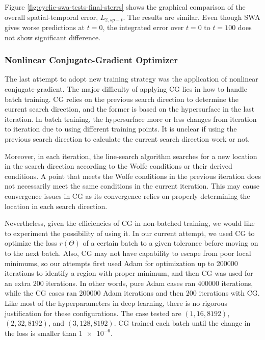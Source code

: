 Figure \ref{fig:cyclic-swa-tests-final-sterrs} shows the graphical comparison of the overall spatial-temporal error, $L_{2,sp-t}$.
The results are similar.
Even though SWA gives worse predictions at $t=0$, the integrated error over $t=0$ to $t=100$ does not show significant difference.

\subsubsection{Nonlinear Conjugate-Gradient Optimizer}
\label{sec:ncg-tests}

The last attempt to adopt new training strategy was the application of nonlinear conjugate-gradient.
The major difficulty of applying CG lies in how to handle batch training.
CG relies on the previous search direction to determine the current search direction, and the former is based on the hypersurface in the last iteration.
In batch training, the hypersurface more or less changes from iteration to iteration due to using different training points.
It is unclear if using the previous search direction to calculate the current search direction work or not.

Moreover, in each iteration, the line-search algorithm searches for a new location in the search direction according to the Wolfe conditions or their derived conditions.
A point that meets the Wolfe conditions in the previous iteration does not necessarily meet the same conditions in the current iteration.
This may cause convergence issues in CG as its convergence relies on properly determining the location in each search direction.

Nevertheless, given the efficiencies of CG in non-batched training, we would like to experiment the possibility of using it.
In our current attempt, we used CG to optimize the loss $r(\Theta)$ of a certain batch to a given tolerance before moving on to the next batch.
Also, CG may not have capability to escape from poor local minimums, so our attempts first used Adam for optimization up to \num{200000} iterations to identify a region with proper minimum, and then CG was used for an extra 200 iterations.
In other words, pure Adam cases ran \num{400000} iterations, while the CG cases ran \num{200000} Adam iterations and then \num{200} iterations with CG.
Like most of the hyperparameters in deep learning, there is no rigorous justification for these configurations.
The case tested are $(1, 16, 8192)$, $(2, 32, 8192)$, and $(3, 128, 8192)$.
CG trained each batch until the change in the loss is smaller than $\num{1e-6}$.

